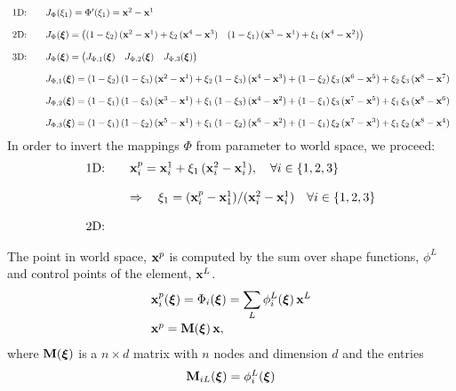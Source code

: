 \begin{equation*}
  \begin{array}{lll}
    \text{1D:}\quad &J_\Phi(\xi_1) = \Phi'(\xi_1) = \textbf{x}^2-\textbf{x}^1\\[4mm]
    \text{2D:}\quad &J_\Phi(\boldsymbol{\xi}) = \left(\begin{matrix}(1-\xi_2)\,(
    \textbf{x}^2-\textbf{x}^1)+\xi_2\,(\textbf{x}^4-\textbf{x}^3) & (1-\xi_1)
    \,(\textbf{x}^3-\textbf{x}^1) +\xi_1\,(\textbf{x}^4-\textbf{x}^2)\end{matrix}\right)\\[4mm]
    \text{3D:}\quad &J_\Phi(\boldsymbol{\xi}) = \left(\begin{matrix}J_{\Phi,1}(\boldsymbol{\xi}) & J_{\Phi,2}(\boldsymbol{\xi}) & J_{\Phi,3}(\boldsymbol{\xi})\end{matrix}\right)\\[4mm]
    & J_{\Phi,1}(\boldsymbol{\xi}) =
     (1-\xi_2)\,(1-\xi_3)\,(\textbf{x}^2-\textbf{x}^1)
     +\xi_2\,(1-\xi_3)\,(\textbf{x}^4-\textbf{x}^3)
     +(1-\xi_2)\,\xi_3\,(\textbf{x}^6-\textbf{x}^5)
     +\xi_2\,\xi_3\,(\textbf{x}^8-\textbf{x}^7) \\[4mm]
    & J_{\Phi,2}(\boldsymbol{\xi}) =
     (1-\xi_1)\,(1-\xi_3)\,(\textbf{x}^3 -\textbf{x}^1)
     + \xi_1\,(1-\xi_3)\,(\textbf{x}^4-\textbf{x}^2)
     + (1-\xi_1)\,\xi_3\,(\textbf{x}^7-\textbf{x}^5)
     + \xi_1\,\xi_3\,(\textbf{x}^8-\textbf{x}^6) \\[4mm]
    & J_{\Phi,3}(\boldsymbol{\xi}) =
     (1-\xi_1)\,(1-\xi_2)\,(\textbf{x}^5 -\textbf{x}^1)
     + \xi_1\,(1-\xi_2)\,(\textbf{x}^6-\textbf{x}^2)
     + (1-\xi_1)\,\xi_2\,(\textbf{x}^7-\textbf{x}^3)
     + \xi_1\,\xi_2\,(\textbf{x}^8-\textbf{x}^4)
    
  \end{array}
\end{equation*}
In order to invert the mappings $\Phi$ from parameter to world space, we proceed:
\begin{equation*}
  \begin{array}{lll}
    \text{1D:}\quad &\textbf{x}^p_i = \textbf{x}_i^1 + \xi_1\,(\textbf{x}^2_i - \textbf{x}^1_i), \quad \forall i \in \{1,2,3\}\\[4mm]
    & \Rightarrow \quad \xi_1 = (\textbf{x}^p_i - \textbf{x}^1_1) / (\textbf{x}^2_i - \textbf{x}^1_i) \quad \forall i \in \{1,2,3\}\\[4mm]
    \text{2D:}\quad & 
  \end{array}
\end{equation*}

The point in world space, $\textbf{x}^{p}$ is computed by the sum over shape functions, $\phi^{L}$ and control points of the element, $\textbf{x}^{L}$.
\begin{equation*}
  \begin{array}{lll}
    \textbf{x}^{p}_i(\boldsymbol{\xi}) = \Phi_i(\boldsymbol{\xi}) = \displaystyle\sum\limits_{L} \phi^{L}_i(\boldsymbol{\xi})\,\textbf{x}^{L} \\[4mm]
    \textbf{x}^{p} = \textbf{M}(\boldsymbol{\xi})\,\textbf{x},
  \end{array}
\end{equation*}
where $\textbf{M}(\boldsymbol{\xi})$ is a $n \times d$ matrix with $n$ nodes and dimension $d$ and the entries 
\begin{equation*}
  \begin{array}{lll}
    \textbf{M}_{iL}(\boldsymbol{\xi}) =  \phi^{L}_i(\boldsymbol{\xi})
  \end{array}
\end{equation*}


